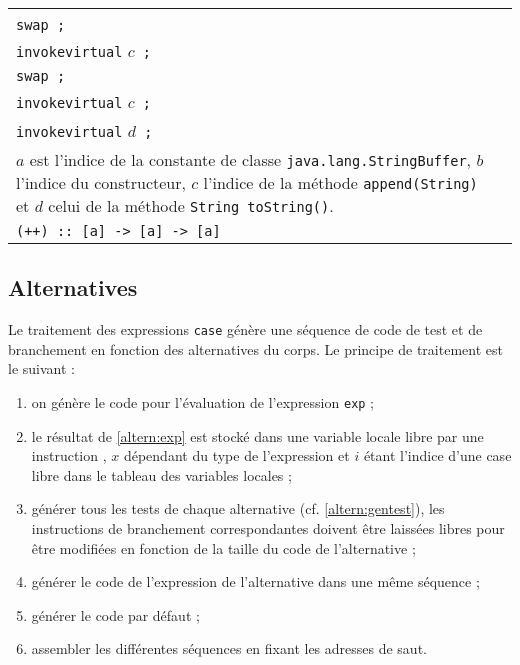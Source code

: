 \begin{table}
\begin{center}
\begin{tabular}{|l@{$\qquad\longrightarrow\qquad$}l|}
\begin{minipage}[t]{5cm}
    \texttt{invokespecial} \texttt{$b$ ;} \\
    \texttt{swap ;} \\
    \texttt{invokevirtual} \texttt{$c$ ;} \\
    \texttt{swap ;} \\
    \texttt{invokevirtual} \texttt{$c$ ;} \\
    \texttt{invokevirtual} \texttt{$d$ ;} \\
    {\footnotesize $a$ est l'indice de la constante de classe
      \texttt{java.lang.StringBuffer}, $b$ l'indice du constructeur,
      $c$ l'indice de la m\'ethode \texttt{append(String)} et $d$ celui
      de la m\'ethode \texttt{String toString()}.}
    \end{minipage} \\
\hline
\verb|(++) :: [a] -> [a] -> [a]|  & \\
\hline
\end{tabular}
\end{center}
\end{table}

\subsection{Alternatives}

Le traitement des expressions \texttt{case} g\'en\`ere une s\'equence de
code de test et de branchement en fonction des alternatives du
corps. Le principe de traitement est le suivant :
\begin{enumerate}
  \item \label{altern:exp} on g\'en\`ere le code pour l'\'evaluation de l'expression
    \texttt{exp} ;
  \item le r\'esultat de \ref{altern:exp} est stock\'e dans une variable
    locale libre par une instruction , $x$
    d\'ependant du type de l'expression et $i$ \'etant l'indice d'une case
    libre dans le tableau des variables locales ;
  \item g\'en\'erer tous les tests de chaque alternative
    (cf. \ref{altern:gentest}), les instructions de branchement
    correspondantes doivent \^etre laiss\'ees libres pour \^etre modifi\'ees
    en fonction de la taille du code de l'alternative ;   
  \item g\'en\'erer le code de l'expression de
    l'alternative dans une m\^eme s\'equence ;
  \item g\'en\'erer le code par d\'efaut ;
  \item assembler les diff\'erentes s\'equences en fixant les adresses de saut.
\end{enumerate}

